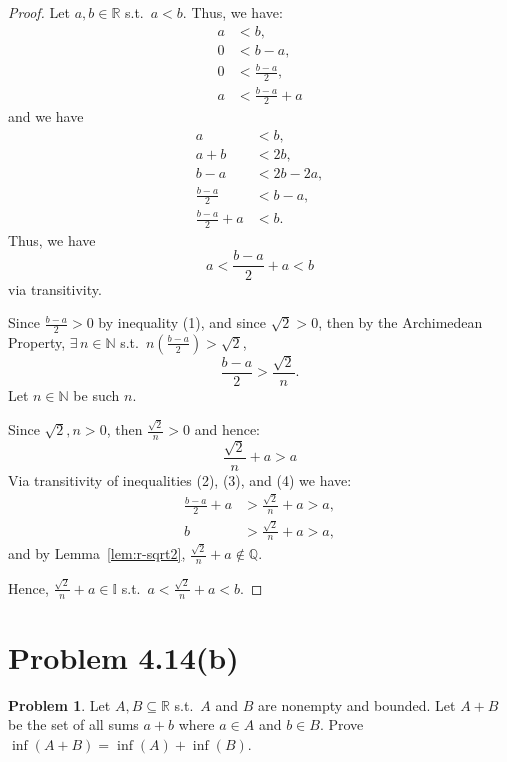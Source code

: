 \documentclass{article}
\theoremstyle{definition}
\newtheorem*{problem}{Problem}
\begin{document}
\begin{proof}
Let $a, b \in \mathbb{R}$ s.t.\ $a < b$. Thus, we have:
\begin{align*}
a &< b, \\
0 &< b - a, \tag{1} \\
0 &< \frac{b-a}{2}, \\
a &< \frac{b-a}{2} + a
\end{align*}
and we have
\begin{align*}
a &< b, \\
a + b &< 2b, \\
b - a &< 2b - 2a, \\
\frac{b-a}{2} &< b - a, \\
\frac{b-a}{2} + a &< b.
\end{align*}
Thus, we have
\begin{equation*}
a < \frac{b-a}{2} + a < b \tag{2}
\end{equation*}
via transitivity.

Since $\frac{b-a}{2} > 0$ by inequality (1), and since $\sqrt{2} > 0$, then by the Archimedean Property, $\exists\, n \in \mathbb{N}$ s.t.\ $n\left(\frac{b-a}{2}\right) > \sqrt{2}$,
\begin{equation*}
\frac{b-a}{2} > \frac{\sqrt{2}}{n}. \tag{3}
\end{equation*}
Let $n \in \mathbb{N}$ be such $n$.

Since $\sqrt{2}, n > 0$, then $\frac{\sqrt{2}}{n} > 0$ and hence:
\begin{equation*}
\frac{\sqrt{2}}{n} + a > a \tag{4}
\end{equation*}
Via transitivity of inequalities (2), (3), and (4) we have:
\begin{align*}
\frac{b-a}{2} + a &> \frac{\sqrt{2}}{n} + a > a, \\
b &> \frac{\sqrt{2}}{n} + a > a,
\end{align*}
and by Lemma~\ref{lem:r-sqrt2}, $\frac{\sqrt{2}}{n} + a \notin \mathbb{Q}$.

Hence, $\frac{\sqrt{2}}{n} + a \in \mathbb{I}$ s.t.\ $a < \frac{\sqrt{2}}{n} + a < b$.
\end{proof}

\clearpage
\section{Problem 4.14(b)}

\begin{problem}
Let $A, B \subseteq \mathbb{R}$ s.t.\ $A$ and $B$ are nonempty and bounded. Let $A + B$ be the set of all sums $a + b$ where $a \in A$ and $b \in B$. Prove $\inf(A+B) = \inf(A) + \inf(B)$.
\end{problem}
\end{document}
